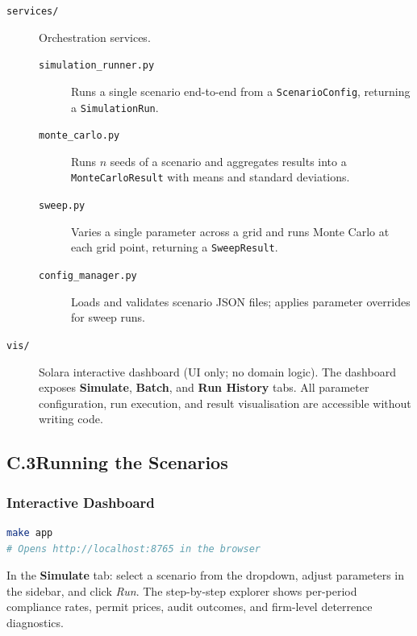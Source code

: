 \begin{description}
    \item[\texttt{services/}] Orchestration services.
    \begin{description}
        \item[\texttt{simulation\_runner.py}] Runs a single scenario end-to-end from a \texttt{ScenarioConfig}, returning a \texttt{SimulationRun}.
        \item[\texttt{monte\_carlo.py}] Runs $n$ seeds of a scenario and aggregates results into a \\ \texttt{MonteCarloResult} with means and standard deviations.
        \item[\texttt{sweep.py}] Varies a single parameter across a grid and runs Monte Carlo at each grid point, returning a \texttt{SweepResult}.
        \item[\texttt{config\_manager.py}] Loads and validates scenario JSON files; applies parameter overrides for sweep runs.
    \end{description}

    \item[\texttt{vis/}] Solara interactive dashboard (UI only; no domain logic).
    The dashboard exposes \textbf{Simulate}, \textbf{Batch}, and \textbf{Run History} tabs. All parameter configuration, run execution, and result visualisation are accessible without writing code.
\end{description}

\subsection*{C.3\quad Running the Scenarios}

\subsubsection*{Interactive Dashboard}

\begin{lstlisting}[language=bash, caption={Launching the dashboard}]
make app
# Opens http://localhost:8765 in the browser
\end{lstlisting}

In the \textbf{Simulate} tab: select a scenario from the dropdown, adjust parameters in the sidebar, and click \emph{Run}. The step-by-step explorer shows per-period compliance rates, permit prices, audit outcomes, and firm-level deterrence diagnostics.


